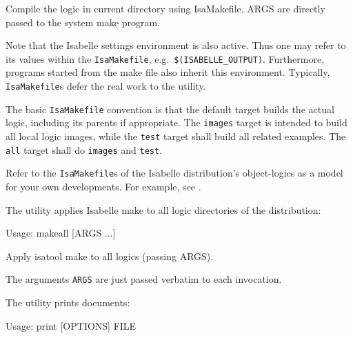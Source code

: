 \begin{isabellebody}
\begin{isamarkuptext}
\begin{ttbox}
  Compile the logic in current directory using IsaMakefile.
  ARGS are directly passed to the system make program.
\end{ttbox}

  Note that the Isabelle settings environment is also active. Thus one
  may refer to its values within the \verb|IsaMakefile|, e.g.\
  \verb|$(ISABELLE_OUTPUT)|. Furthermore, programs started from
  the make file also inherit this environment.  Typically, \verb|IsaMakefile|s defer the real work to the \hyperlink{tool.usedir}{\mbox{}} utility.

  \medskip The basic \verb|IsaMakefile| convention is that the
  default target builds the actual logic, including its parents if
  appropriate.  The \verb|images| target is intended to build all
  local logic images, while the \verb|test| target shall build
  all related examples.  The \verb|all| target shall do
  \verb|images| and \verb|test|.%
\end{isamarkuptext}%
\isamarkuptrue%
%
\isamarkuptrue%
%
\begin{isamarkuptext}%
Refer to the \verb|IsaMakefile|s of the Isabelle distribution's
  object-logics as a model for your own developments.  For example,
  see \hyperlink{file.~~/src/FOL/IsaMakefile}{\mbox{}}.%
\end{isamarkuptext}%
\isamarkuptrue%
%
\isamarkuptrue%
%
\begin{isamarkuptext}%
The \indexdef{}{tool}{makeall}\hypertarget{tool.makeall}{\hyperlink{tool.makeall}{\mbox{\isa{\isatt{makeall}}}}} utility applies Isabelle make to all logic
  directories of the distribution:
\begin{ttbox}
Usage: makeall [ARGS ...]

  Apply isatool make to all logics (passing ARGS).
\end{ttbox}

  The arguments \verb|ARGS| are just passed verbatim to each
  \hyperlink{tool.make}{\mbox{}} invocation.%
\end{isamarkuptext}%
\isamarkuptrue%
%
\isamarkuptrue%
%
\begin{isamarkuptext}%
The \hypertarget{tool.print}{\hyperlink{tool.print}{\mbox{}}} utility prints documents:
\begin{ttbox}
Usage: print [OPTIONS] FILE


\end{ttbox}
\end{isamarkuptext}
\end{isabellebody}
